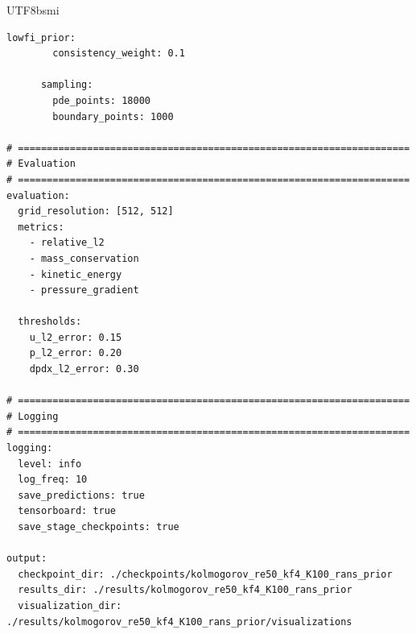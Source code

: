 \documentclass[master]{NTHUthesis}
\begin{document}
\begin{CJK*}{UTF8}{bsmi}
\begin{small}
\begin{lstlisting}[style=yamlStyle]
      lowfi_prior:
        consistency_weight: 0.1
      
      sampling:
        pde_points: 18000
        boundary_points: 1000

# ====================================================================
# Evaluation
# ====================================================================
evaluation:
  grid_resolution: [512, 512]
  metrics:
    - relative_l2
    - mass_conservation
    - kinetic_energy
    - pressure_gradient
  
  thresholds:
    u_l2_error: 0.15
    p_l2_error: 0.20
    dpdx_l2_error: 0.30

# ====================================================================
# Logging
# ====================================================================
logging:
  level: info
  log_freq: 10
  save_predictions: true
  tensorboard: true
  save_stage_checkpoints: true

output:
  checkpoint_dir: ./checkpoints/kolmogorov_re50_kf4_K100_rans_prior
  results_dir: ./results/kolmogorov_re50_kf4_K100_rans_prior
  visualization_dir: ./results/kolmogorov_re50_kf4_K100_rans_prior/visualizations
\end{lstlisting}
\end{small}

\clearpage




\end{CJK*}
\end{document}
